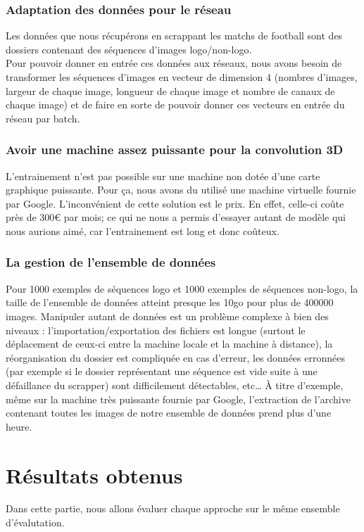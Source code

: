 \documentclass[11pt]{article}
\begin{document}
\subsubsection{Adaptation des données pour le réseau}
\label{sec:org796fd9b}
Les données que nous récupérons en scrappant les matchs de football sont des dossiers contenant des séquences d'images logo/non-logo.\\
Pour pouvoir donner en entrée ces données aux réseaux, nous avons besoin de transformer les séquences d'images en vecteur de dimension 4 (nombres d'images, largeur de chaque image, longueur de chaque image et nombre de canaux de chaque image) et de faire en sorte de pouvoir donner ces vecteurs en entrée du réseau par batch.\\
\subsubsection{Avoir une machine assez puissante pour la convolution 3D}
\label{sec:orgee6b98c}
L'entrainement n'est pas possible sur une machine non dotée d'une carte graphique puissante. Pour ça, nous avons du utilisé une machine virtuelle fournie par Google. L'inconvénient de cette solution est le prix. En effet, celle-ci coûte près de 300€ par mois; ce qui ne nous a permis d'essayer autant de modèle qui nous aurions aimé, car l'entrainement est long et donc coûteux.\\
\subsubsection{La gestion de l'ensemble de données}
\label{sec:orgd59fb20}
Pour 1000 exemples de séquences logo et 1000 exemples de séquences non-logo, la taille de l'ensemble de données atteint presque les 10go pour plus de 400000 images. Manipuler autant de données est un problème complexe à bien des niveaux : l'importation/exportation des fichiers est longue (surtout le déplacement de ceux-ci entre la machine locale et la machine à distance), la réorganisation du dossier est compliquée en cas d'erreur, les données erronnées (par exemple si le dossier représentant une séquence est vide suite à une défaillance du scrapper) sont difficilement détectables, etc\ldots{} À titre d'exemple, même sur la machine très puissante fournie par Google, l'extraction de l'archive contenant toutes les images de notre ensemble de données prend plus d'une heure.\\
\newpage
\section{Résultats obtenus}
\label{sec:org6e9c4af}
Dans cette partie, nous allons évaluer chaque approche sur le même ensemble d'évalutation.\\
\end{document}
